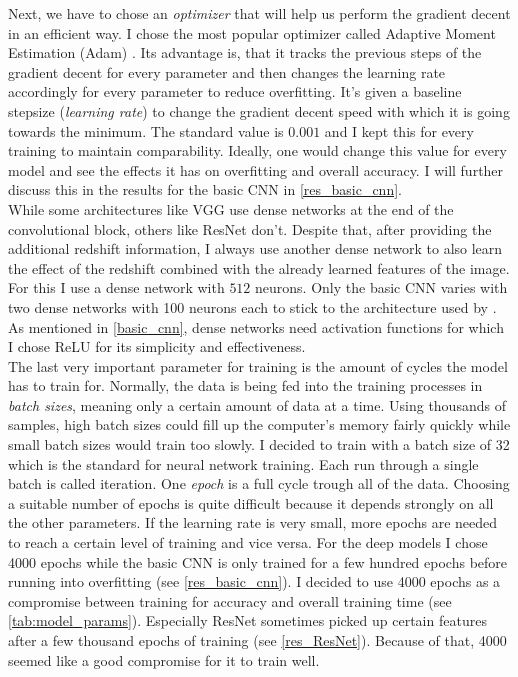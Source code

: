 Next, we have to chose an \textit{optimizer} that will help us perform the gradient decent in an efficient way. I chose the most popular optimizer called Adaptive Moment Estimation (Adam) \citep{kingma2017adam}. Its advantage is, that it tracks the previous steps of the gradient decent for every parameter and then changes the learning rate accordingly for every parameter to reduce overfitting. It's given a baseline stepsize (\textit{learning rate}) to change the gradient decent speed with which it is going towards the minimum. The standard value is $0.001$ and I kept this for every training to maintain comparability. Ideally, one would change this value for every model and see the effects it has on overfitting and overall accuracy. I will further discuss this in the results for the basic CNN in \cref{res_basic_cnn}.\\

While some architectures like VGG use dense networks at the end of the convolutional block, others like ResNet don't. Despite that, after providing the additional redshift information, I always use another dense network to also learn the effect of the redshift combined with the already learned features of the image. For this I use a dense network with $512$ neurons. Only the basic CNN varies with two dense networks with 100 neurons each to stick to the architecture used by \citet{Krippendorf_2023}. As mentioned in \cref{basic_cnn}, dense networks need activation functions for which I chose ReLU for its simplicity and effectiveness.\\

The last very important parameter for training is the amount of cycles the model has to train for. Normally, the data is being fed into the training processes in \textit{batch sizes}, meaning only a certain amount of data at a time. Using thousands of samples, high batch sizes could fill up the computer's memory fairly quickly while small batch sizes would train too slowly. I decided to train with a batch size of 32 which is the standard for neural network training. Each run through a single batch is called iteration. One \textit{epoch} is a full cycle trough all of the data. Choosing a suitable number of epochs is quite difficult because it depends strongly on all the other parameters. If the learning rate is very small, more epochs are needed to reach a certain level of training and vice versa. For the deep models I chose 4000 epochs while the basic CNN is only trained for a few hundred epochs before running into overfitting (see \cref{res_basic_cnn}). I decided to use 4000 epochs as a compromise between training for accuracy and overall training time (see \autoref{tab:model_params}). Especially ResNet sometimes picked up certain features after a few thousand epochs of training (see \cref{res_ResNet}). Because of that, 4000 seemed like a good compromise for it to train well.



